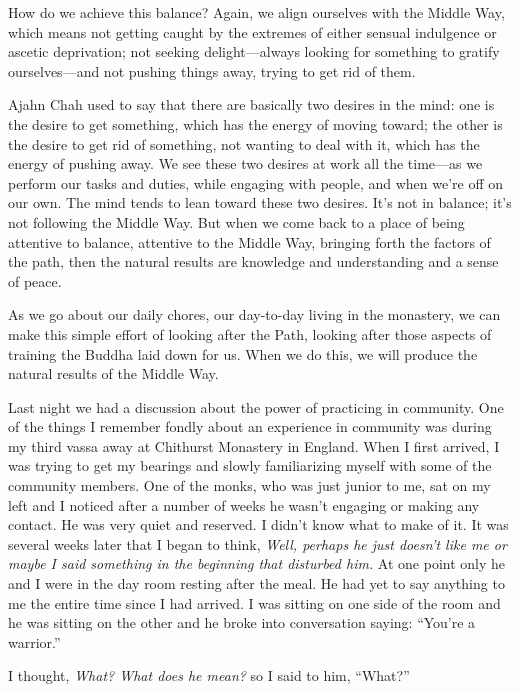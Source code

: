How do we achieve this balance? Again, we align ourselves with the 
Middle Way, which means not getting caught by the extremes of either 
sensual indulgence or ascetic deprivation; not seeking delight---always 
looking for something to gratify ourselves---and not pushing things 
away, trying to get rid of them.

Ajahn Chah used to say that there are basically two desires in the 
mind: one is the desire to get something, which has the energy of 
moving toward; the other is the desire to get rid of something, not 
wanting to deal with it, which has the energy of pushing away. We see 
these two desires at work all the time---as we perform our tasks and 
duties, while engaging with people, and when we're off on our own. The 
mind tends to lean toward these two desires. It's not in balance; it's 
not following the Middle Way. But when we come back to a place of being 
attentive to balance, attentive to the Middle Way, bringing forth the 
factors of the path, then the natural results are knowledge and 
understanding and a sense of peace.

As we go about our daily chores, our day-to-day living in the 
monastery, we can make this simple effort of looking after the Path, 
looking after those aspects of training the Buddha laid down for us. 
When we do this, we will produce the natural results of the Middle Way.


Last night we had a discussion about the power of practicing in 
community. One of the things I remember fondly about an experience in 
community was during my third vassa away at Chithurst Monastery in 
England. When I first arrived, I was trying to get my bearings and 
slowly familiarizing myself with some of the community members. One of 
the monks, who was just junior to me, sat on my left and I noticed 
after a number of weeks he wasn't engaging or making any contact. He 
was very quiet and reserved. I didn't know what to make of it. It was 
several weeks later that I began to think, \emph{Well, perhaps he just 
doesn't like me or maybe I said something in the beginning that 
disturbed him.} At one point only he and I were in the day room resting 
after the meal. He had yet to say anything to me the entire time since 
I had arrived. I was sitting on one side of the room and he was sitting 
on the other and he broke into conversation saying: ``You're a 
warrior.''

I thought, \emph{What? What does he mean?} so I said to him, ``What?''

